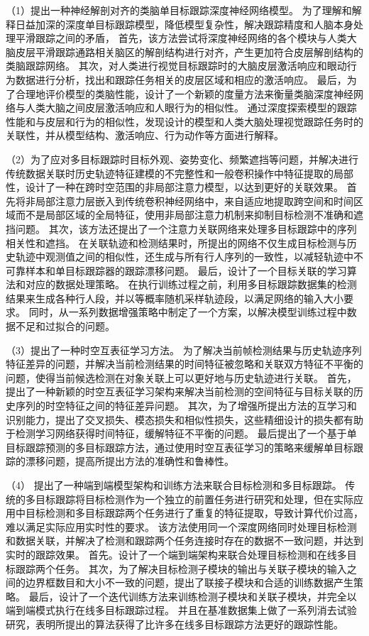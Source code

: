 （1）提出一种神经解剖对齐的类脑单目标跟踪深度神经网络模型。
为了理解和解释日益加深的深度单目标跟踪模型，降低模型复杂性，解决跟踪精度和人脑本身处理平滑跟踪之间的矛盾，
首先，该方法尝试将深度神经网络的各个模块与人类大脑皮层平滑跟踪通路相关脑区的解剖结构进行对齐，产生更加符合皮层解剖结构的类脑跟踪网络。
其次，对人类进行视觉目标跟踪时的大脑皮层激活响应和眼动行为数据进行分析，找出和跟踪任务相关的皮层区域和相应的激活响应。
最后，为了合理地评价模型的类脑性能，设计了一个新颖的度量方法来衡量类脑深度神经网络与人类大脑之间皮层激活响应和人眼行为的相似性。
通过深度探索模型的跟踪性能和与皮层和行为的相似性，发现设计的模型和人类大脑处理视觉跟踪任务时的关联性，并从模型结构、激活响应、行为动作等方面进行解释。

（2）为了应对多目标跟踪时目标外观、姿势变化、频繁遮挡等问题，并解决进行传统数据关联时历史轨迹特征建模的不完整性和一般卷积操作中特征提取的局部性，设计了一种在跨时空范围的非局部注意力模型，以达到更好的关联效果。
首先将非局部注意力层嵌入到传统卷积神经网络中，来自适应地提取跨空间和时间区域而不是局部区域的全局特征，使用非局部注意力机制来抑制目标检测不准确和遮挡问题。
其次，该方法还提出了一个注意力关联网络来处理多目标跟踪中的序列相关性和遮挡。
在关联轨迹和检测结果时，所提出的网络不仅生成目标检测与历史轨迹中观测值之间的相似性，还生成与所有行人序列的一致性，以减轻轨迹中不可靠样本和单目标跟踪器的跟踪漂移问题。
最后，设计了一个目标关联的学习算法和对应的数据处理策略。
在执行训练过程之前，利用多目标跟踪数据集的检测结果来生成各种行人段，并以等概率随机采样轨迹段，以满足网络的输入大小要求。
同时，从一系列数据增强策略中制定了一个方案，以解决模型训练过程中数据不足和过拟合的问题。

（3）提出了一种时空互表征学习方法。
为了解决当前帧检测结果与历史轨迹序列特征差异的问题，并解决当前检测结果的时间特征被忽略和关联双方特征不平衡的问题，使得当前候选检测在对象关联上可以更好地与历史轨迹进行关联。
首先，提出了一种新颖的时空互表征学习架构来解决当前检测的空间特征与目标关联的历史序列的时空特征之间的特征差异问题。
其次，为了增强所提出方法的互学习和识别能力，提出了交叉损失、模态损失和相似性损失，这些精细设计的损失都有助于检测学习网络获得时间特征，缓解特征不平衡的问题。
最后提出了一个基于单目标跟踪预测的多目标跟踪方法，通过使用时空互表征学习的策略来缓解单目标跟踪的漂移问题，提高所提出方法的准确性和鲁棒性。

（4）
提出了一种端到端模型架构和训练方法来联合目标检测和多目标跟踪。
传统的多目标跟踪将目标检测作为一个独立的前置任务进行研究和处理，但在实际应用中目标检测和多目标跟踪两个任务进行了重复的特征提取，导致计算代价过高，难以满足实际应用实时性的要求。
该方法使用同一个深度网络同时处理目标检测和数据关联，并解决了检测和跟踪两个任务连接时存在的数据不一致问题，并达到实时的跟踪效果。
首先。设计了一个端到端架构来联合处理目标检测和在线多目标跟踪两个任务。
其次，为了解决目标检测子模块的输出与关联子模块的输入之间的边界框数目和大小不一致的问题，提出了联接子模块和合适的训练数据产生策略。
最后，设计了一个迭代训练方法来训练检测子模块和关联子模块，并完全以端到端模式执行在线多目标跟踪过程。
并且在基准数据集上做了一系列消去试验研究，表明所提出的算法获得了比许多在线多目标跟踪方法更好的跟踪性能。

